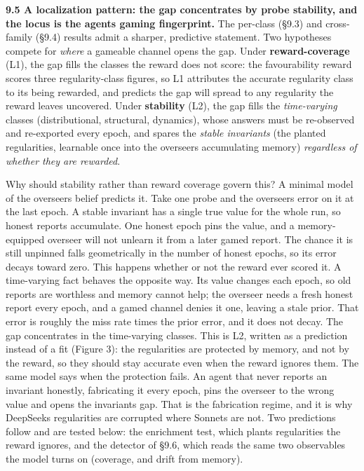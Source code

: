 \documentclass[11pt]{article}
\begin{document}
\textbf{9.5 A localization pattern: the gap concentrates by probe
stability, and the locus is the agent\textquotesingle s gaming
fingerprint.} The per-class (§9.3) and cross-family (§9.4) results admit
a sharper, predictive statement. Two hypotheses compete for \emph{where}
a gameable channel opens the gap. Under \textbf{reward-coverage} (L1),
the gap fills the classes the reward does not score: the favourability
reward scores three regularity-class figures, so L1 attributes the
accurate regularity class to its being rewarded, and predicts the gap
will spread to any regularity the reward leaves uncovered. Under
\textbf{stability} (L2), the gap fills the \emph{time-varying} classes
(distributional, structural, dynamics), whose answers must be
re-observed and re-exported every epoch, and spares the \emph{stable
invariants} (the planted regularities, learnable once into the
overseer\textquotesingle s accumulating memory) \emph{regardless of
whether they are rewarded}.

Why should stability rather than reward coverage govern this? A minimal
model of the overseer\textquotesingle s belief predicts it. Take one
probe and the overseer\textquotesingle s error on it at the last epoch.
A stable invariant has a single true value for the whole run, so honest
reports accumulate. One honest epoch pins the value, and a
memory-equipped overseer will not unlearn it from a later gamed report.
The chance it is still unpinned falls geometrically in the number of
honest epochs, so its error decays toward zero. This happens whether or
not the reward ever scored it. A time-varying fact behaves the opposite
way. Its value changes each epoch, so old reports are worthless and
memory cannot help; the overseer needs a fresh honest report every
epoch, and a gamed channel denies it one, leaving a stale prior. That
error is roughly the miss rate times the prior error, and it does not
decay. The gap concentrates in the time-varying classes. This is L2,
written as a prediction instead of a fit (Figure 3): the regularities
are protected by memory, and not by the reward, so they should stay
accurate even when the reward ignores them. The same model says when the
protection fails. An agent that never reports an invariant honestly,
fabricating it every epoch, pins the overseer to the wrong value and
opens the invariant\textquotesingle s gap. That is the fabrication
regime, and it is why DeepSeek\textquotesingle s regularities are
corrupted where Sonnet\textquotesingle s are not. Two predictions follow
and are tested below: the enrichment test, which plants regularities the
reward ignores, and the detector of §9.6, which reads the same two
observables the model turns on (coverage, and drift from memory).
\end{document}

